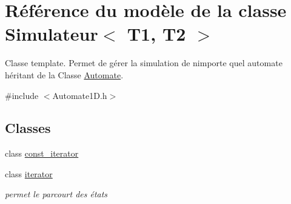 \hypertarget{class_simulateur}{}\section{Référence du modèle de la classe Simulateur$<$ T1, T2 $>$}
\label{class_simulateur}


Classe template. Permet de gérer la simulation de n\textquotesingle{}importe quel automate héritant de la Classe \hyperlink{class_automate}{Automate}.  




{\ttfamily \#include $<$Automate1\+D.\+h$>$}

\subsection*{Classes}
\begin{DoxyCompactItemize}
\item 
class \hyperlink{class_simulateur_1_1const__iterator}{const\+\_\+iterator}
\item 
class \hyperlink{class_simulateur_1_1iterator}{iterator}
\begin{DoxyCompactList}\small\item\em permet le parcourt des états \end{DoxyCompactList}\end{DoxyCompactItemize}
